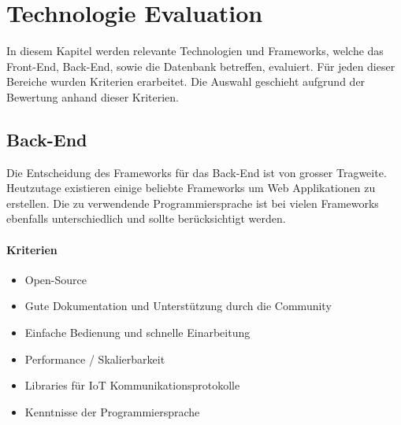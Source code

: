\chapter{Technologie Evaluation}
In diesem Kapitel werden relevante Technologien und Frameworks, welche das Front-End, Back-End, sowie die Datenbank betreffen, evaluiert. Für jeden dieser Bereiche wurden Kriterien erarbeitet. Die Auswahl geschieht aufgrund der Bewertung anhand dieser Kriterien.

\section{Back-End}
Die Entscheidung des Frameworks für das Back-End ist von grosser Tragweite. Heutzutage existieren einige beliebte Frameworks um Web Applikationen zu erstellen. Die zu verwendende Programmiersprache ist bei vielen Frameworks ebenfalls unterschiedlich und sollte berücksichtigt werden.

\subsubsection{Kriterien}
\begin{itemize}
\item Open-Source
\item Gute Dokumentation und Unterstützung durch die Community
\item Einfache Bedienung und schnelle Einarbeitung
\item Performance / Skalierbarkeit
\item Libraries für IoT Kommunikationsprotokolle
\item Kenntnisse der Programmiersprache
\end{itemize}

